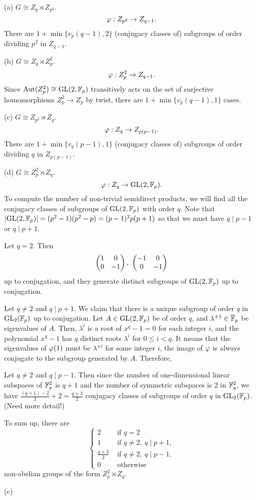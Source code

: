 \documentclass{../../large}
\begin{document}
\begin{pf}
(a) $G\cong Z_q\rtimes Z_{p^2}$.
\[\varphi:Z_{p^2}\to Z_{q-1}.\]
There are $1+\min\{v_p(q-1),2\}$ (conjugacy classes of) subgroups of order dividing $p^2$ in $Z_{q-1}$.

(b) $G\cong Z_q\rtimes Z_p^2$.
\[\varphi:Z_p^2\to Z_{q-1}.\]
Since $\operatorname{Aut}(Z_p^2)\cong\mathrm{GL}(2,\mathbb{F}_p)$ transitively acts on the set of surjective homomorphisms $Z_p^2\to Z_p$ by twist, there are $1+\min\{v_p(q-1),1\}$ cases.

(c) $G\cong Z_{p^2}\rtimes Z_q$.
\[\varphi:Z_q\to Z_{p(p-1)}.\]
There are $1+\min\{v_q(p-1),1\}$ (conjugacy classes of) subgroups of order dividing $q$ in $Z_{p(p-1)}$.

(d) $G\cong Z_p^2\rtimes Z_q$.
\[\varphi:Z_q\to\mathrm{GL}(2,\mathbb{F}_p).\]
To compute the number of non-trivial semidirect products, we will find all the conjugacy classes of subgroups of $\mathrm{GL}(2,\mathbb{F}_p)$ with order $q$.
Note that $|\mathrm{GL}(2,\mathbb{F}_p)|=(p^2-1)(p^2-p)=(p-1)^2p(p+1)$ so that we must have $q\mid p-1$ or $q\mid p+1$.

Let $q=2$.
Then
\[\mat{1&0\\0&-1},\ \mat{-1&0\\0&-1}\]
up to conjugation, and they generate distinct subgroups of $\mathrm{GL}(2,\mathbb{F}_p)$ up to conjugation.

Let $q\ne2$ and $q\mid p+1$.
We claim that there is a unique subgroup of order $q$ in $\mathrm{GL}_2(\mathbb{F}_p)$ up to conjugation.
Let $A\in\mathrm{GL}(2,\mathbb{F}_p)$ be of order $q$, and $\lambda^{\pm1}\in\overline{\mathbb{F}}_p$ be eigenvalues of $A$.
Then, $\lambda^i$ is a root of $x^q-1=0$ for each integer $i$, and the polynomial $x^q-1$ has $q$ distinct roots $\lambda^i$ for $0\le i<q$.
It means that the eigenvalues of $\varphi(1)$ must be $\lambda^{\pm i}$ for some integer $i$, the image of $\varphi$ is always conjugate to the subgroup generated by $A$.
Therefore, 

Let $q\ne2$ and $q\mid p-1$.
Then since the number of one-dimensional linear subspaces of $\mathbb{F}_p^2$ is $q+1$ and the number of symmetric subspaces is 2 in $\mathbb{F}_q^2$, we have $\frac{(q+1)-2}2+2=\frac{q+3}2$ conjugacy classes of subgroups of order $q$ in $\mathrm{GL}_2(\mathbb{F}_p)$. (Need more detail!)

To sum up, there are
\[\begin{cases}
2&\text{ if }q=2\\
1&\text{ if }q\ne2,\ q\mid p+1,\\
\frac{q+3}2&\text{ if }q\ne2,\ q\mid p-1,\\
0&\text{ otherwise }\end{cases}\]
non-abelian groups of the form $Z_p^2\rtimes Z_q$.


(c)

\end{pf}
\end{document}
